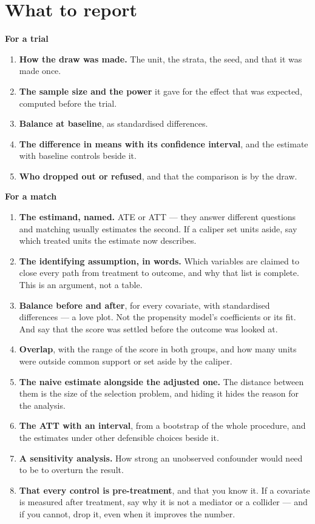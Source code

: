 \documentclass[
  letterpaper,
  10pt,
  twoside,
  openright,
  numbers=noenddot,
  chapterprefix=true]{scrbook}
\providecommand{\tightlist}{%
  \setlength{\itemsep}{0pt}\setlength{\parskip}{0pt}}
\begin{document}
\section{What to report}\label{what-to-report-8}

\textbf{For a trial}

\begin{enumerate}
\def\labelenumi{\arabic{enumi}.}
\tightlist
\item
  \textbf{How the draw was made.} The unit, the strata, the seed, and
  that it was made once.
\item
  \textbf{The sample size and the power} it gave for the effect that was
  expected, computed before the trial.
\item
  \textbf{Balance at baseline}, as standardised differences.
\item
  \textbf{The difference in means with its confidence interval}, and the
  estimate with baseline controls beside it.
\item
  \textbf{Who dropped out or refused}, and that the comparison is by the
  draw.
\end{enumerate}

\textbf{For a match}

\begin{enumerate}
\def\labelenumi{\arabic{enumi}.}
\tightlist
\item
  \textbf{The estimand, named.} ATE or ATT --- they answer different
  questions and matching usually estimates the second. If a caliper set
  units aside, say which treated units the estimate now describes.
\item
  \textbf{The identifying assumption, in words.} Which variables are
  claimed to close every path from treatment to outcome, and why that
  list is complete. This is an argument, not a table.
\item
  \textbf{Balance before and after}, for every covariate, with
  standardised differences --- a love plot. Not the propensity model's
  coefficients or its fit. And say that the score was settled before the
  outcome was looked at.
\item
  \textbf{Overlap}, with the range of the score in both groups, and how
  many units were outside common support or set aside by the caliper.
\item
  \textbf{The naive estimate alongside the adjusted one.} The distance
  between them is the size of the selection problem, and hiding it hides
  the reason for the analysis.
\item
  \textbf{The ATT with an interval}, from a bootstrap of the whole
  procedure, and the estimates under other defensible choices beside it.
\item
  \textbf{A sensitivity analysis.} How strong an unobserved confounder
  would need to be to overturn the result.
\item
  \textbf{That every control is pre-treatment}, and that you know it. If
  a covariate is measured after treatment, say why it is not a mediator
  or a collider --- and if you cannot, drop it, even when it improves
  the number.
\end{enumerate}
\end{document}

